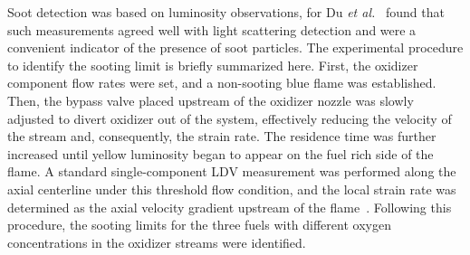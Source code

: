\documentclass[review,3p,times]{elsarticleUS}
\begin{document}

Soot detection was based on luminosity observations, for Du \emph{et al.}~\cite{du89} found that such measurements agreed well with light scattering detection and were a convenient indicator of the presence of soot particles. The experimental procedure to identify the sooting limit is briefly summarized here. First, the oxidizer component flow rates were set, and a non-sooting blue flame was established. Then, the bypass valve placed upstream of the oxidizer nozzle was slowly adjusted to divert oxidizer out of the system, effectively reducing the velocity of the stream and, consequently, the strain rate. The residence time was further increased until yellow luminosity began to appear on the fuel rich side of the flame. A standard single-component LDV measurement was performed along the axial centerline under this threshold flow condition, and the local strain rate was determined as the axial velocity gradient upstream of the flame~\cite{du89}. Following this procedure, the sooting 
limits for the three fuels with different oxygen concentrations in the oxidizer streams were identified.
\end{document}
